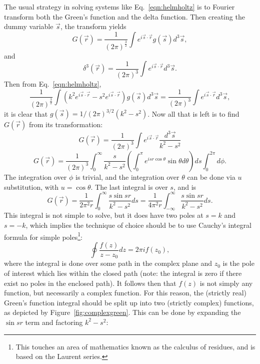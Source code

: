 The usual strategy in solving systems like Eq.~\eqref{eqn:helmholtz} is to Fourier transform both the Green's function and the delta function. Then creating the dummy variable $\vec{s}$, the transform yields
%
\begin{equation} \nonumber
G(\vec{r})=\frac{1}{(2\pi)^\frac{3}{2}}\int e^{i\vec{s}\cdot\vec{r}} g(\vec{s})d^3\vec{s},
\end{equation}
and
%
\begin{equation} \nonumber
\delta^3(\vec{r})=\frac{1}{(2\pi)^3}\int e^{i\vec{s}\cdot\vec{r}} d^3\vec{s}.
\end{equation}
Then from Eq.~\eqref{eqn:helmholtz},
%
\begin{equation} \nonumber
\frac{1}{(2\pi)^\frac{3}{2}}\int (k^2e^{i\vec{s}\cdot\vec{r}}-s^2e^{i\vec{s}\cdot\vec{r}})g(\vec{s})d^3\vec{s}=\frac{1}{(2\pi)^3}\int e^{i\vec{s}\cdot\vec{r}}d^3\vec{s},
\end{equation}
it is clear that $g(\vec{s})=1/(2\pi)^{3/2}(k^2-s^2)$. Now all that is left is to find $G(\vec{r})$ from its transformation:
%
\begin{equation} \nonumber
G(\vec{r})=\frac{1}{(2\pi)^3}\int e^{i\vec{s}\cdot\vec{r}}\frac{d^3\vec{s}}{k^2-s^2}
\end{equation}
%
\begin{equation} \nonumber
G(\vec{r})=\frac{1}{(2\pi)^3}\int_0^\infty \frac{s}{k^2-s^2} \left(\int_0^\pi e^{isr\cos\theta}\sin\theta d\theta\right)ds \int_0^{2\pi}d\phi.
\end{equation}
The integration over $\phi$ is trivial, and the integration over $\theta$ can be done via $u$ substitution, with $u=\cos\theta$. The last integral is over $s$, and is
%
\begin{equation} \nonumber
G(\vec{r})=\frac{1}{2\pi^2r}\int_0^\infty\frac{s\sin{sr}}{k^2-s^2}ds=\frac{1}{4\pi^2r}\int_{-\infty}^\infty\frac{s\sin{sr}}{k^2-s^2}ds.
\end{equation}
This integral is not simple to solve, but it does have two poles at $s=k$ and $s=-k$, which implies the technique of choice should be to use Cauchy's integral formula for simple poles\footnote{This touches an area of mathematics known as the calculus of residues, and is based on the Laurent series.}:
%
\begin{equation}
\label{eqn:cauchy}
\oint \frac{f(z)}{z-z_0}dz=2\pi if(z_0),
\end{equation}
where the integral is done over some path in the complex plane and $z_0$ is the pole of interest which lies within the closed path (note: the integral is zero if there exist no poles in the enclosed path). It follows then that $f(z)$ is not simply any function, but necessarily a complex function. For this reason, the (strictly real) Green's function integral should be split up into two (strictly complex) functions, as depicted by Figure~\ref{fig:complexgreen}. This can be done by expanding the $\sin sr$ term and factoring $k^2-s^2$:
